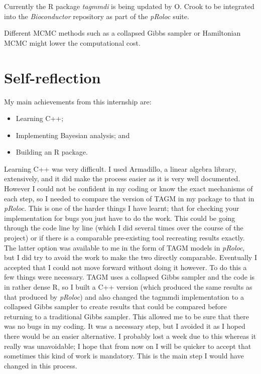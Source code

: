 \documentclass[11pt]{article} %
\begin{document}
Currently the R package \emph{tagmmdi} is being updated by O. Crook to be integrated into the \emph{Bioconductor} repository as part of the \emph{pRoloc} suite.

Different MCMC methods such as a collapsed Gibbs sampler or Hamiltonian MCMC might lower the computational cost.

\section{Self-reflection}
My main achievements from this internship are:
\begin{itemize}
 \item Learning C++;
 \item Implementing Bayesian analysis; and
 \item Building an R package.
\end{itemize}
Learning C++ was very difficult. I used Armadillo, a linear algebra library, extensively, and it did make the process easier as it is very well documented. However I could not be confident in my coding or know the exact mechanisms of each step, so I needed to compare the version of TAGM in my package to that in \emph{pRoloc}. This is one of the harder things I  have learnt; that for checking your implementation for bugs you just have to do the work. This could be going through the code line by line (which I did several times over the course of the project) or if there is a comparable pre-existing tool recreating results exactly. The latter option was available to me in the form of TAGM models in \emph{pRoloc}, but I did try to avoid the work to make the two directly comparable. Eventually I accepted that I could not move forward without doing it however. To do this a few things were necessary. TAGM uses a collapsed Gibbs sampler and the code is in rather dense R, so I built a C++ version (which produced the same results as that produced by \emph{pRoloc}) and also changed the tagmmdi implementation to a collapsed Gibbs sampler to create results that could be compared before returning to a traditional Gibbs sampler. This allowed me to be sure that there was no bugs in my coding. It was a necessary step, but I avoided it as I hoped there would be an easier alternative. I probably lost a week due to this whereas it really was unavoidable; I hope that from now on I will be quicker to accept that sometimes this kind of work is mandatory. This is the main step I would have changed in this process.
\end{document}
